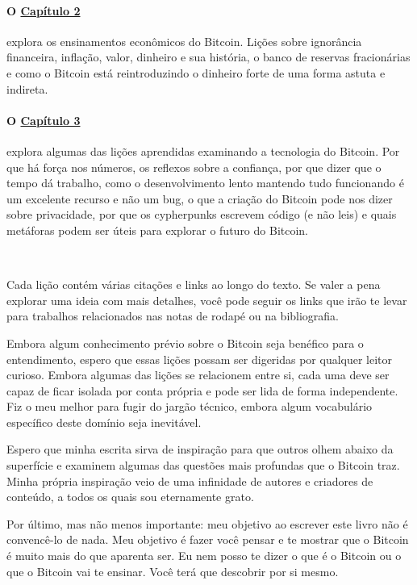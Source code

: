 \paragraph{O \hyperref[ch:economics]{Capítulo 2}}{explora os ensinamentos econômicos do Bitcoin. Lições sobre ignorância financeira, inflação, valor, dinheiro e sua história, o banco de reservas fracionárias e como o Bitcoin está reintroduzindo o dinheiro forte de uma forma astuta e indireta.}

\paragraph{O \hyperref[ch:technology]{Capítulo 3}}{explora algumas das lições aprendidas examinando a tecnologia do Bitcoin. Por que há força nos números, os reflexos sobre a confiança, por que dizer que o tempo dá trabalho, como o desenvolvimento lento mantendo tudo funcionando é um excelente recurso e não um bug, o que a criação do Bitcoin pode nos dizer sobre privacidade, por que os cypherpunks escrevem código (e não leis) e quais metáforas podem ser úteis para explorar o futuro do Bitcoin.}

~

Cada lição contém várias citações e links ao longo do texto. Se valer a pena explorar uma ideia com mais detalhes, você pode seguir os links que irão te levar para trabalhos relacionados nas notas de rodapé ou na bibliografia.

Embora algum conhecimento prévio sobre o Bitcoin seja benéfico para o entendimento, espero que essas lições possam ser digeridas por qualquer leitor curioso. Embora algumas das lições se relacionem entre si, cada uma deve ser capaz de ficar isolada por conta própria e pode ser lida de forma independente. Fiz o meu melhor para fugir do jargão técnico, embora algum vocabulário específico deste domínio seja inevitável.

Espero que minha escrita sirva de inspiração para que outros olhem abaixo da superfície e examinem algumas das questões mais profundas que o Bitcoin traz. Minha própria inspiração veio de uma infinidade de autores e criadores de conteúdo, a todos os quais sou eternamente grato.

Por último, mas não menos importante: meu objetivo ao escrever este livro não é convencê-lo de nada. Meu objetivo é fazer você pensar e te mostrar que o Bitcoin é muito mais do que aparenta ser. Eu nem posso te dizer o que é o Bitcoin ou o que o Bitcoin vai te ensinar. Você terá que descobrir por si mesmo.

